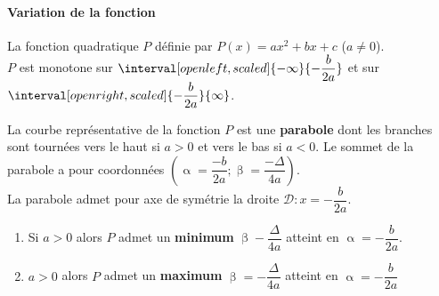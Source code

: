 \documentclass[main.tex]{subfiles}
\begin{document}
\paragraph{Variation de la fonction} 
La fonction quadratique $P$ définie par $P(x)=ax^2+bx+c$ ($a \neq 0$).\\
$P$ est monotone sur $\interval[open left,scaled]{-\infty}{-\dfrac{b}{2a}}$ et sur $\interval[open right,scaled]{-\dfrac{b}{2a}}{\infty}$.

\noindent La courbe représentative de la fonction $P$ est une \textbf{parabole} dont les branches sont tournées vers le haut si $a>0$ et vers le bas si $a<0$. Le sommet de la parabole a pour coordonnées $\left(\upalpha=\dfrac{-b}{2a};\upbeta=\dfrac{-\Delta}{4a}\right)$. \\
La parabole admet pour axe de symétrie la droite $\mathcal{D} \colon x=-\dfrac{b}{2a}$.
\\
\begin{enumerate}[label=\textbullet,leftmargin=*]
	\item  Si $a>0$ alors $P$  admet un \textbf{minimum}   $\upbeta-\dfrac{\Delta}{4a}$ atteint en $\upalpha=-\dfrac{b}{2a}$. 
\begin{center}
\end{center} 
	\item  $a>0$ alors $P$  admet un \textbf{maximum}   $\upbeta=-\dfrac{\Delta}{4a}$ atteint en $\upalpha=-\dfrac{b}{2a}$
\end{enumerate}

\begin{center} 
\end{center} 
\noindent 


    
  


%	 
\end{document}
